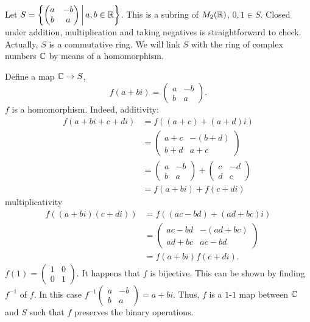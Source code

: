 \documentclass[10pt, a4paper]{article}
\begin{document}
\begin{example}
    Let $S = \left\{\begin{pmatrix}
        a & -b \\ b & a
    \end{pmatrix}\,\middle|\, a, b \in \mathbb{R}\right\}$.
    This is a subring of $M_2(\mathbb{R})$,
    $0, 1 \in S$.
    Closed under addition,
    multiplication and taking negatives is straightforward to check.
    Actually,
    $S$ is a commutative ring.
    We will link $S$ with the ring of complex numbers $\mathbb{C}$ by means of a homomorphism.

    Define a map $\mathbb{C} \to S$,
    \[
    f(a + bi) = \begin{pmatrix}
        a & -b \\ b & a
    \end{pmatrix}.
    \]
    $f$ is a homomorphism.
    Indeed,
    additivity:
    \begin{align*}
        f(a + bi + c + di) &= f((a + c) + (a + d)i) \\
        &= \begin{pmatrix}
            a + c & -(b + d) \\ b + d & a + c
        \end{pmatrix} \\
        &= \begin{pmatrix}
            a & -b \\ b & a
        \end{pmatrix} + \begin{pmatrix}
            c & -d \\ d & c
        \end{pmatrix} \\
        &= f(a + bi) + f(c + di)
    \end{align*}
    multiplicativity
    \begin{align*}
        f((a + bi)(c + di)) &= f((ac - bd) + (ad + bc)i) \\
        &= \begin{pmatrix}
            ac - bd & -(ad + bc) \\
            ad + bc & ac - bd
        \end{pmatrix} \\
        &= f(a + bi)f(c + di).
    \end{align*}
    $f(1) = \begin{pmatrix}
        1 & 0 \\ 0 & 1
    \end{pmatrix}$.
    It happens that $f$ is bijective.
    This can be shown by finding $f ^ {-1}$ of $f$.
    In this case $f ^ {-1}\begin{pmatrix}
        a & -b \\ b & a
    \end{pmatrix} = a + bi$.
    Thus,
    $f$ is a $1$-$1$ map between $\mathbb{C}$ and $S$ such that $f$ preserves the binary operations.
\end{example}
\end{document}
